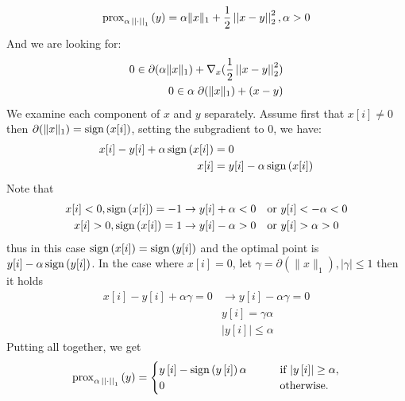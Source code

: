 \documentclass[12pt,twoside]{article}
\begin{document}
\begin{enumerate}
\begin{enumerate}
$$
\operatorname{prox}_{\alpha \, \left|\left|  \cdot  \right|\right| _{1}}\left(  y  \right) = \alpha \|x\|_1 + \frac{1}{2} \left|\left| x-y \right|\right| _{2}^2, \alpha > 0
$$
And we are looking for:
\begin{align*}
	0 \in \partial( \alpha \|x\|_1) + \nabla_x (\frac{1}{2} \left|\left| x-y \right|\right| _{2}^2) \\
	0 \in \alpha \; \partial( \|x\|_1) + (x-y) \\
\end{align*}
We examine each component of $x$ and $y$ separately.
Assume first that $x[i] \neq 0$ then $ \partial( \|x\|_1) = \operatorname{sign}\left( x[i] \right)$, setting the subgradient to $0$, we have:
\begin{align*}
	x[i] - y[i] + \alpha \operatorname{sign}\left( x[i] \right)	&= 0 \\
	x[i]					&= y[i] - \alpha \operatorname{sign}\left( x[i] \right) \\
\end{align*}
Note that
\begin{align*}
	x[i] < 0, \operatorname{sign}\left( x[i] \right) = -1 &\rightarrow y[i] + \alpha < 0 \text{ ~ or }  y[i] < -\alpha < 0 \\
	x[i] > 0, \operatorname{sign}\left( x[i] \right) = 1 &\rightarrow y[i] - \alpha > 0 \text{ ~ or }  y[i] > \alpha > 0 \\
\end{align*}
thus in this case $\operatorname{sign}\left( x[i] \right) = \operatorname{sign}\left( y[i] \right)$ and the optimal point is $y[i] - \alpha \operatorname{sign}\left( y[i] \right)$.
In the case where $x[i]=0$, let $\gamma =  \partial(\|x\|_1), | \gamma | \le 1$ then it holds
\begin{align*}
	x[i] - y[i] + \alpha \gamma = 0 &\rightarrow y[i] - \alpha \gamma = 0 \\
							&	y[i] = \gamma \alpha \\
							& |y[i]| \le \alpha
\end{align*}
Putting all together, we get
\begin{align}
\operatorname{prox}_{\alpha \, \left|\left|  \cdot  \right|\right| _{1}}\left(  y  \right) = 
\begin{cases}
y\,[i] - \operatorname{sign}\left( y\,[i] \right) \alpha  \qquad & \text{if $\lvert y\,[i]\rvert \geq \alpha$}, \\
0 \quad & \text{otherwise}.
\end{cases}
\end{align}


\end{enumerate}
\end{enumerate}
\end{document}
